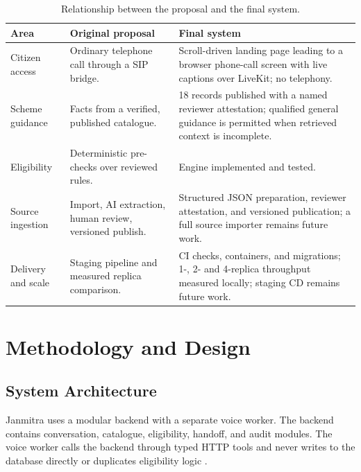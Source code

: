 \documentclass[11pt,a4paper,oneside]{report}
\begin{document}
\begin{table}[htbp]
\centering\small
\begin{tabularx}{\textwidth}{@{}P{0.21\textwidth}YY@{}}
\toprule
\textbf{Area} & \textbf{Original proposal} & \textbf{Final system} \\
\midrule
Citizen access & Ordinary telephone call through a SIP bridge.
  & Scroll-driven landing page leading to a browser phone-call screen with
    live captions over LiveKit; no telephony. \\
Scheme guidance & Facts from a verified, published catalogue.
  & 18 records published with a named reviewer attestation; qualified general
    guidance is permitted when retrieved context is incomplete. \\
Eligibility & Deterministic pre-checks over reviewed rules.
  & Engine implemented and tested. \\
Source ingestion & Import, AI extraction, human review, versioned publish.
  & Structured JSON preparation, reviewer attestation, and versioned
    publication; a full source importer remains future work. \\
Delivery and scale & Staging pipeline and measured replica comparison.
  & CI checks, containers, and migrations; 1-, 2- and 4-replica throughput
    measured locally; staging CD remains future work. \\
\bottomrule
\end{tabularx}
\caption{Relationship between the proposal and the final system.}
\label{tab:scope}
\end{table}

\chapter{Methodology and Design}

\section{System Architecture}
Janmitra uses a modular backend with a separate voice worker. The backend contains
conversation, catalogue, eligibility, handoff, and audit modules. The voice worker
calls the backend through typed HTTP tools and never writes to the database
directly or duplicates eligibility logic \cite{architecture}.
\end{document}
